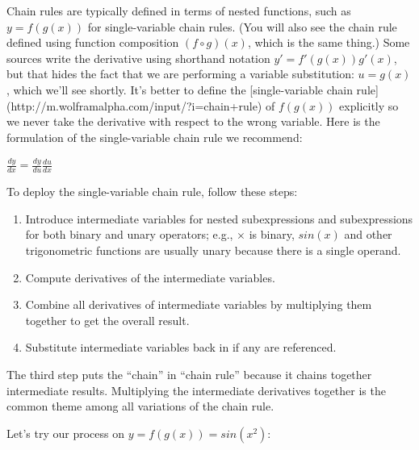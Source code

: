 \documentclass[11pt]{article}
\begin{document}
Chain rules are typically defined in terms of nested functions, such as $y = f(g(x))$ for single-variable chain rules. (You will also see the chain rule defined using function composition $(f \circ g)(x)$, which is the same thing.)  Some sources write the derivative using shorthand notation $y' = f'(g(x))g'(x)$, but that hides the fact that we are performing a variable substitution: $u = g(x)$, which we'll see shortly. It's better to define the [single-variable chain rule](http://m.wolframalpha.com/input/?i=chain+rule) of $f(g(x))$ explicitly so we never take the derivative with respect to the wrong variable. Here is the formulation of the single-variable chain rule we recommend:

$\frac{dy}{dx} = \frac{dy}{du}\frac{du}{dx}$

To deploy the single-variable chain rule, follow these steps:

\begin{enumerate}
	\item  Introduce intermediate variables for nested subexpressions and subexpressions for both binary and unary operators; e.g., $\times$ is binary, $sin(x)$ and other trigonometric functions are usually unary because there is a single operand.
	\item Compute derivatives of the intermediate variables.
	\item Combine all derivatives of intermediate variables by multiplying them together to get the overall result.
	\item Substitute intermediate variables back in if any are referenced.
\end{enumerate}

The third step puts the ``chain'' in ``chain rule'' because it chains together intermediate results. Multiplying the intermediate derivatives together is the common theme among all variations of the chain rule.

Let's try our process on $y = f(g(x)) = sin(x^2)$:
\end{document}
